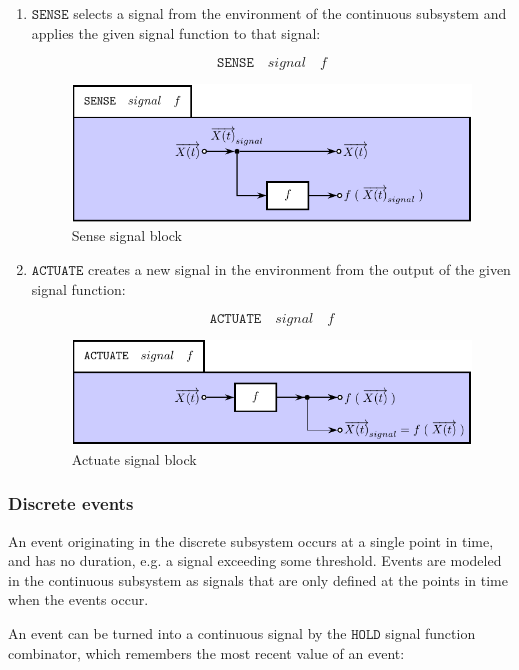 \documentclass[a4paper]{article}
\begin{document}
\begin{enumerate}
\item $\texttt{SENSE}$ selects a signal from the environment of the
  continuous subsystem and applies the given signal function to that
  signal:

\[\texttt{SENSE}\quad{}signal\quad{}f\]

\begin{figure}
\includegraphics{figures/SenseSignalBlock}
\caption{\label{Fig:SenseSignalBlock}Sense signal block}
\end{figure}

\item $\texttt{ACTUATE}$ creates a new signal in the environment from
  the output of the given signal function:

\[\texttt{ACTUATE}\quad{}signal\quad{}f\]

\begin{figure}
\includegraphics{figures/ActuateSignalBlock}
\caption{\label{Fig:ActuateSignalBlock}Actuate signal block}
\end{figure}

\end{enumerate}

\subsubsection{Discrete events}

An event originating in the discrete subsystem occurs at a single
point in time, and has no duration, e.g. a signal exceeding some
threshold. Events are modeled in the continuous subsystem as signals
that are only defined at the points in time when the events occur.

An event can be turned into a continuous signal by the $\texttt{HOLD}$
signal function combinator, which remembers the most recent value of
an event:
\end{document}
